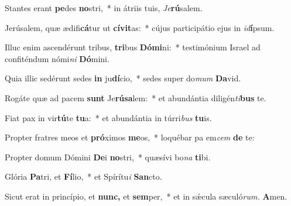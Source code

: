 \item Stantes erant \textbf{pe}des \textbf{no}stri,~* in átriis tuis, \thinspace\textit{Je}\textbf{rú}salem.
\item Jerúsalem, quæ ædifi\textbf{cá}tur ut \textbf{cívit}as:~* cújus participátio ejus in \textit{id}\textbf{í}psum.
\item Illuc enim ascendérunt tribus, \textbf{tri}bus \textbf{Dómi}ni:~* testimónium Israel ad confiténdum nómi\textit{ni} \textbf{Dó}mini.
\item Quia illic sedérunt sedes \textbf{in} ju\textbf{dí}cio,~* sedes super do\textit{mum} \textbf{Da}vid.
\item Rogáte quæ ad pacem \textbf{sunt} Je\textbf{rúsa}lem:~* et abundántia diligén\textit{ti}\textbf{bus} te.
\item Fiat pax in vir\textbf{tú}te \textbf{tu}a:~* et abundántia in túrri\textit{bus} \textbf{tu}is.
\item Propter fratres meos et \textbf{pró}ximos \textbf{me}os,~* loquébar pa em\textit{cem} \textbf{de} te:
\item Propter domum Dómini \textbf{De}i \textbf{no}stri,~* quæsívi bo\textit{na} \textbf{ti}bi.
\item Glória \textbf{Pa}tri, et \textbf{Fí}lio,~* et Spírítu\textit{i} \textbf{San}cto.
\item Sicut erat in princípio, et \textbf{nunc,} et \textbf{sem}per,~* et in sǽcula sæculó\textit{rum.} \textbf{A}men.